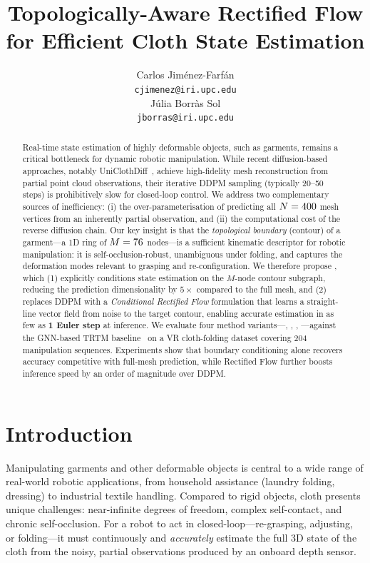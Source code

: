 \documentclass{article}
\title{Topologically-Aware Rectified Flow for Efficient Cloth State Estimation}
\author{
  Carlos Jiménez-Farfán\\
  \texttt{cjimenez@iri.upc.edu} \\
  \And
  Júlia Borràs Sol \\
  \texttt{jborras@iri.upc.edu} \\
}
\begin{document}
\maketitle

\begin{abstract}
Real-time state estimation of highly deformable objects, such as garments, remains a critical bottleneck for dynamic robotic manipulation.
While recent diffusion-based approaches, notably UniClothDiff~\cite{tian2025uniclothdiff}, achieve high-fidelity mesh reconstruction from partial point cloud observations, their iterative DDPM sampling (typically 20--50 steps) is prohibitively slow for closed-loop control.
We address two complementary sources of inefficiency: (i) the over-parameterisation of predicting all $N=400$ mesh vertices from an inherently partial observation, and (ii) the computational cost of the reverse diffusion chain.
Our key insight is that the \emph{topological boundary} (contour) of a garment---a 1D ring of $M=76$ nodes---is a sufficient kinematic descriptor for robotic manipulation: it is self-occlusion-robust, unambiguous under folding, and captures the deformation modes relevant to grasping and re-configuration.
We therefore propose \ours{}, which (1) explicitly conditions state estimation on the $M$-node contour subgraph, reducing the prediction dimensionality by $5\times$ compared to the full mesh, and (2) replaces DDPM with a \emph{Conditional Rectified Flow} formulation that learns a straight-line vector field from noise to the target contour, enabling accurate estimation in as few as \textbf{1 Euler step} at inference.
We evaluate four method variants---\fullddpm, \edgeddpm, \fullfm, \edgefm{}---against the GNN-based TRTM baseline~\cite{trtm} on a VR cloth-folding dataset covering 204 manipulation sequences.
Experiments show that boundary conditioning alone recovers accuracy competitive with full-mesh prediction, while Rectified Flow further boosts inference speed by an order of magnitude over DDPM.
\end{abstract}

\section{Introduction}
\label{sec:intro}

Manipulating garments and other deformable objects is central to a wide range of real-world robotic applications, from household assistance (\eg laundry folding, dressing) to industrial textile handling.
Compared to rigid objects, cloth presents unique challenges: near-infinite degrees of freedom, complex self-contact, and chronic self-occlusion.
For a robot to act in closed-loop---re-grasping, adjusting, or folding---it must continuously and \emph{accurately} estimate the full 3D state of the cloth from the noisy, partial observations produced by an onboard depth sensor.
\end{document}

